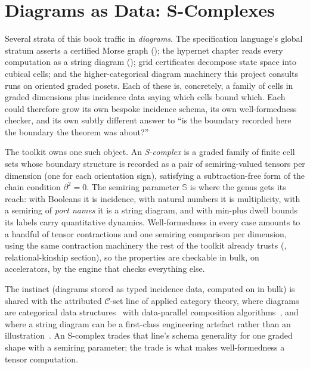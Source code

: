 \chapter{Diagrams as Data: S-Complexes}
\label{ch:qtsl-scomplexes}

\noindent\draftmark\medskip

Several strata of this book traffic in \emph{diagrams}. The
specification language's global stratum asserts a certified Morse graph
(); the hypernet
chapter reads every computation as a string diagram
(); grid
certificates decompose state space into cubical cells; and the
higher-categorical diagram machinery this project consults runs on
oriented graded posets. Each of these is, concretely, a family of
cells in graded dimensions plus incidence data saying which cells
bound which. Each could therefore grow its own bespoke incidence
schema, its own well-formedness checker, and its own subtly different
answer to ``is the boundary recorded here the boundary the theorem
was about?''

The toolkit owns one such object. An \emph{S-complex} is a graded
family of finite cell sets whose boundary structure is recorded as a
pair of semiring-valued tensors per dimension (one for each
orientation sign), satisfying a subtraction-free form of the chain
condition $\partial^2 = 0$. The semiring parameter $\mathbb{S}$ is where
the genus gets its reach: with Booleans it is incidence, with natural
numbers it is multiplicity, with a semiring of \emph{port names} it
is a string diagram, and with min-plus dwell bounds its labels carry
quantitative dynamics. Well-formedness in every case amounts to a
handful of tensor contractions and one semiring comparison per
dimension, using the same contraction machinery the rest of the
toolkit already trusts (, relational-kinship section), so the properties are
checkable in bulk, on accelerators, by the engine that checks
everything else.

The instinct (diagrams stored as typed incidence data, computed on
in bulk) is shared with the attributed $\mathcal{C}$-set line of
applied category theory, where diagrams are categorical data
structures~\cite{patterson21} with data-parallel composition
algorithms~\cite{wilson23}, and where a string diagram can be a
first-class engineering artefact rather than an
illustration~\cite{master19}. An S-complex trades that line's schema
generality for one graded shape with a semiring parameter; the trade
is what makes well-formedness a tensor computation.

